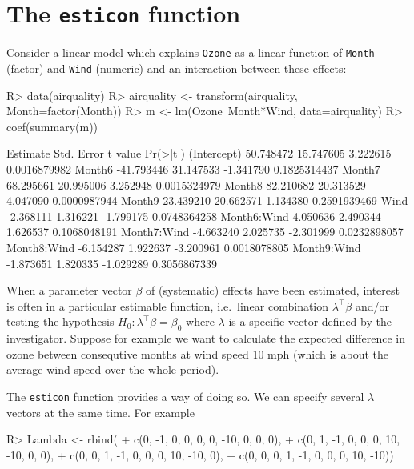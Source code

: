 \documentclass[11pt]{article}
\def\code#1{\texttt{#1}}
\begin{document}
\section{The \code{esticon} function}
\label{esticon}

Consider a linear model which explains \code{Ozone} as a linear
function of \code{Month} (factor) and \code{Wind} (numeric) and an
interaction between these effects:

\begin{Schunk}
\begin{Sinput}
R> data(airquality)
R> airquality <- transform(airquality, Month=factor(Month))
R> m <- lm(Ozone~Month*Wind, data=airquality)
R> coef(summary(m))
\end{Sinput}
\begin{Soutput}
              Estimate Std. Error   t value     Pr(>|t|)
(Intercept)  50.748472  15.747605  3.222615 0.0016879982
Month6      -41.793446  31.147533 -1.341790 0.1825314437
Month7       68.295661  20.995006  3.252948 0.0015324979
Month8       82.210682  20.313529  4.047090 0.0000987944
Month9       23.439210  20.662571  1.134380 0.2591939469
Wind         -2.368111   1.316221 -1.799175 0.0748364258
Month6:Wind   4.050636   2.490344  1.626537 0.1068048191
Month7:Wind  -4.663240   2.025735 -2.301999 0.0232898057
Month8:Wind  -6.154287   1.922637 -3.200961 0.0018078805
Month9:Wind  -1.873651   1.820335 -1.029289 0.3056867339
\end{Soutput}
\end{Schunk}

When a parameter vector $\beta$ of (systematic) effects have been
estimated, interest is often in a particular estimable function, i.e.\
linear combination $\lambda^\top \beta$ and/or testing the hypothesis
$H_0: \lambda^\top \beta=\beta_0$ where $\lambda$ is a specific vector
defined by the investigator.  Suppose for example we want to calculate
the expected difference in ozone between consequtive months at wind
speed 10 mph (which is about the average wind speed over the whole
period).

The \code{esticon} function provides a way of doing so. We can
specify several $\lambda$ vectors at the same time. For example

\begin{Schunk}
\begin{Sinput}
R> Lambda <- rbind(
+    c(0, -1,  0,  0,  0, 0, -10,   0,   0,   0),
+    c(0,  1, -1,  0,  0, 0,  10, -10,   0,   0),
+    c(0,  0,  1, -1,  0, 0,   0,  10, -10,   0),
+    c(0,  0,  0,  1, -1, 0,   0,   0,  10, -10))
\end{Sinput}
\end{Schunk}
\end{document}
